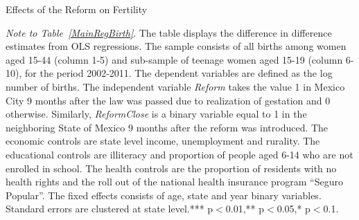 \documentclass[a4paper, 11pt]{article}
\begin{document}
\begin{spacing}{2}
\begin{table}\caption{Effects of the Reform on Fertility} \label{MainRegBirth}
\begin{threeparttable}
 {\footnotesize  }
\begin{tablenotes}
\footnotesize
\item \textit{Note to Table~\ref{MainRegBirth}}. The table displays the difference in difference estimates from OLS regressions. The sample consists of all births among women aged 15-44 (column 1-5) and sub-sample of teenage women aged 15-19 (column 6-10), for the period 2002-2011. The dependent variables are defined as the log number of births. The independent variable \textit{Reform} takes the value 1 in Mexico City 9 months after the law was passed due to realization of gestation and 0 otherwise. Similarly, \textit{ReformClose} is a binary variable equal to 1 in the neighboring State of Mexico 9 months after the reform was introduced. The economic controls are state level income, unemployment and rurality. The educational controls are illiteracy and proportion of people aged 6-14 who are not enrolled in school. The health controls are the proportion of residents with no health rights and the roll out of the national health insurance program ``Seguro Popular''. The fixed effects consists of age, state and year binary variables. Standard errors are clustered at state level.*** p$<$0.01,** p$<$0.05,* p$<$0.1.
\end{tablenotes} 
\end{threeparttable}
\end{table}


\end{spacing}
\end{document}
